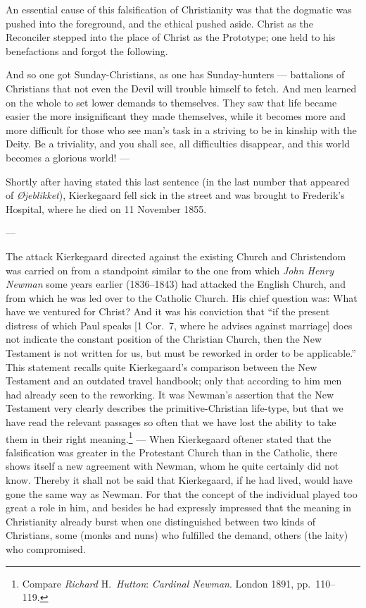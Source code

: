 \documentclass[12pt,a4paper]{book}
\newcommand{\opage}[1]{\marginnote{\footnotesize\textit{[#1]}}}
\begin{document}
An essential cause of this falsification of Christianity was that the dogmatic was pushed into the
foreground, and the ethical pushed aside. Christ as the Reconciler stepped \opage{170}into the place of Christ
as the Prototype; one held to his benefactions and forgot the following.

And so one got Sunday-Christians, as one has Sunday-hunters --- battalions of Christians that not
even the Devil will trouble himself to fetch. And men learned on the whole to set lower demands to
themselves. They saw that life became easier the more insignificant they made themselves, while it
becomes more and more difficult for those who see man's task in a striving to be in kinship with
the Deity. Be a triviality, and you shall see, all difficulties disappear, and this world becomes a
glorious world! ---

Shortly after having stated this last sentence (in the last number that appeared of
\emph{Øjeblikket}), Kierkegaard fell sick in the street and was brought to Frederik's Hospital,
where he died on 11 November 1855.

\begin{center}---\end{center}

The attack Kierkegaard directed against the existing Church and Christendom was carried on from a
standpoint similar to the one from which \emph{John Henry Newman} some years earlier (1836--1843) had
attacked the English Church, and from which he was led over to the Catholic Church. His chief
question was: What have we ventured for Christ? And it was his conviction that ``if the present
distress of which Paul speaks [1 Cor.\ 7, where he advises against marriage] does not indicate the
constant position of the Christian Church, then the New Testament is not written for us, but must
be reworked in order to be applicable.'' This statement recalls quite Kierkegaard's comparison
between the New Testament and an outdated travel handbook; only that according to him men had
already seen to the reworking. It was Newman's assertion that the New Testament very clearly
describes the primitive-Christian life-type, but that we have read the relevant passages so often
that we have lost the ability to take them in their right meaning.\footnote{Compare \emph{Richard} H.\
\emph{Hutton}: \emph{Cardinal Newman}. London 1891, pp.~110--119.} --- When Kierkegaard oftener stated
that \opage{171}the falsification was greater in the Protestant Church than in the Catholic, there shows
itself a new agreement with Newman, whom he quite certainly did not know. Thereby it shall not be
said that Kierkegaard, if he had lived, would have gone the same way as Newman. For that the
concept of the individual played too great a role in him, and besides he had expressly impressed
that the meaning in Christianity already burst when one distinguished between two kinds of
Christians, some (monks and nuns) who fulfilled the demand, others (the laity) who compromised.
\end{document}
